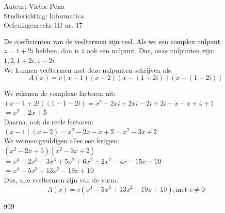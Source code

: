 \documentclass[a4paper]{article}
\begin{document}
  
\noindent \large Auteur: Victor Pena \\
\noindent \large Studierichting: Informatica\\
\noindent \large Oefeningenreeks 1D nr. 17\\

\medskip

\normalsize

De coefficienten van de veeltermen zijn reel. Als we een complex nulpunt $z = 1+ 2i$ hebben, dan is $\overline{z}$ ook een nulpunt. Dus, onze nulpunten zijn: $1, 2, 1+2i, 1-2i$\\

We kunnen veeltermen met deze nulpunten schrijven als:\\
$$A(x) = c(x-1)(x-2)(x-(1+2i))(x-(1-2i)) $$

We rekenen de complexe factoren uit:\\

$(x-1+2i)(1-1-2i) = x^2-2xi+2xi-2i+2i-x-x+4+1$\\

$=x^2-2x+5$\\


Daarna, ook de reele factoren:\\

$(x-1)(x-2) = x^2-2x-x+2 = x^2-3x+2$\\

We vermenigvuldigen alles een krijgen:\\

$(x^2-2x+5)(x^2-3x+2)$\\

$=x^4-2x^3-3x^3+5x^2+6x^2+2x^2-4x-15x+10$\\

$=x^4-5x^3+13x^2-19x+10$\\

Dus, alle veeltermen zijn van de vorm:\\

$$A(x) = c(x^4-5x^3+13x^2-19x+10), \text{met } c \neq 0$$





\begin{thebibliography}{999}
\end{thebibliography}
\end{document}
